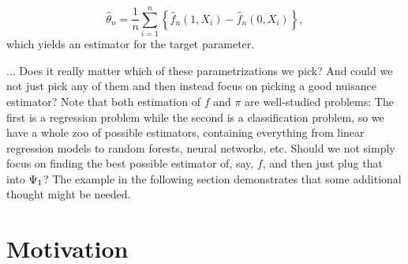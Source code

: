 \documentclass[a4,danish]{article}
\begin{document}
\begin{equation*}
  \hat{\theta}_n = \frac{1}{n} \sum_{i=1}^{n}
  \left\{
    \hat{f}_n(1, X_i) - \hat{f}_n(0, X_i)
  \right\},
\end{equation*}
which yields an estimator for the target parameter.

... Does it really matter which of these parametrizations we pick? And could we not just pick any of
them and then instead focus on picking a good nuisance estimator? Note that both estimation of $f$
and $\pi$ are well-studied problems: The first is a regression problem while the second is a
classification problem, so we have a whole zoo of possible estimators, containing everything from
linear regression models to random forests, neural networks, etc. Should we not simply focus on
finding the best possible estimator of, say, $f$, and then just plug that into $\operatorname{\Psi}_1$? The example
in the following section demonstrates that some additional thought might be needed.

\section{Motivation}
\label{sec:motivation}
\end{document}
